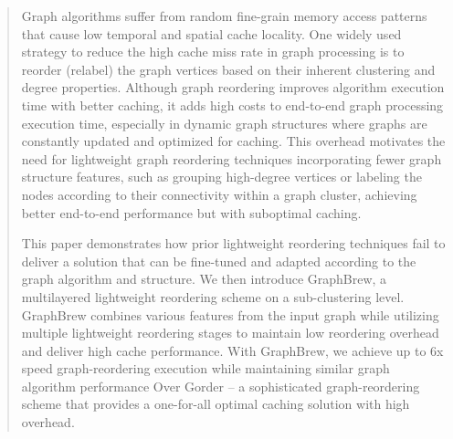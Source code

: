 \documentclass[sigconf, nonacm]{acmart}
\begin{document}
\author{Kevin Skadron}
\begin{abstract}
Graph algorithms suffer from random fine-grain memory access patterns that cause low temporal and spatial cache locality. One widely used strategy to reduce the high cache miss rate in graph processing is to reorder (relabel) the graph vertices based on their inherent clustering and degree properties. Although graph reordering improves algorithm execution time with better caching, it adds high costs to end-to-end graph processing execution time, especially in dynamic graph structures where graphs are constantly updated and optimized for caching. This overhead motivates the need for lightweight graph reordering techniques incorporating fewer graph structure features, such as grouping high-degree vertices or labeling the nodes according to their connectivity within a graph cluster, achieving better end-to-end performance but with suboptimal caching.

This paper demonstrates how prior lightweight reordering techniques fail to deliver a solution that can be fine-tuned and adapted according to the graph algorithm and structure. We then introduce GraphBrew, a multilayered lightweight reordering scheme on a sub-clustering level. GraphBrew combines various features from the input graph while utilizing multiple lightweight reordering stages to maintain low reordering overhead and deliver high cache performance. With GraphBrew, we achieve up to 6x speed graph-reordering execution while maintaining similar graph algorithm performance Over Gorder -- a sophisticated graph-reordering scheme that provides a one-for-all optimal caching solution with high overhead. 
\end{abstract}

\maketitle
\end{document}
